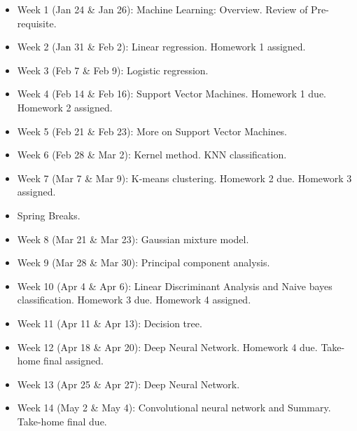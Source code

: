 \documentclass[a4paper,10pt]{article}
\begin{document}
\begin{itemize}

\item Week 1 (Jan 24 \& Jan 26): Machine Learning: Overview.  Review of Pre-requisite. 

\item Week 2 (Jan 31 \& Feb 2): Linear regression. Homework 1 assigned. 

\item Week 3 (Feb 7 \& Feb 9): Logistic regression. 

\item Week 4 (Feb 14 \& Feb 16): Support Vector Machines. Homework 1 due. Homework 2 assigned.

\item Week 5 (Feb 21 \& Feb 23): More on Support Vector Machines.  

\item Week 6 (Feb 28 \& Mar 2): Kernel method. KNN classification. 

\item Week 7 (Mar 7 \& Mar 9): K-means clustering.  Homework 2 due.  Homework 3 assigned.

\item Spring Breaks.

\item Week 8 (Mar 21 \& Mar 23):  Gaussian mixture model. 

\item Week 9 (Mar 28 \& Mar 30): Principal component analysis. 

\item Week 10 (Apr 4 \& Apr 6):  Linear Discriminant Analysis and Naive bayes classification. Homework 3 due. Homework 4 assigned.

\item Week 11 (Apr 11 \& Apr 13): Decision tree.  

\item Week 12 (Apr 18 \& Apr 20): Deep Neural Network. Homework 4 due. Take-home final assigned.

\item Week 13 (Apr 25 \& Apr 27): Deep Neural Network. 

\item Week 14 (May 2 \& May 4): Convolutional neural network and Summary. Take-home final due. 
 
\end{itemize}
\end{document}

